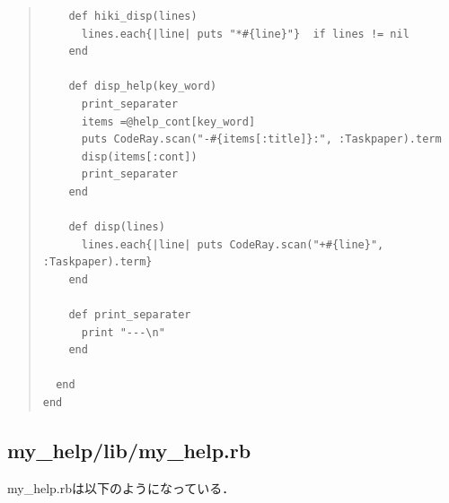\begin{quote}
\begin{verbatim}
    def hiki_disp(lines)
      lines.each{|line| puts "*#{line}"}  if lines != nil
    end

    def disp_help(key_word)
      print_separater
      items =@help_cont[key_word]
      puts CodeRay.scan("-#{items[:title]}:", :Taskpaper).term
      disp(items[:cont])
      print_separater
    end

    def disp(lines)
      lines.each{|line| puts CodeRay.scan("+#{line}", :Taskpaper).term}
    end

    def print_separater
      print "---\n"
    end
    
  end
end
\end{verbatim}\end{quote}

\subsection{my\_help/lib/my\_help.rb}
\begin{description}
\item my\_help.rbは以下のようになっている．
\end{description}

